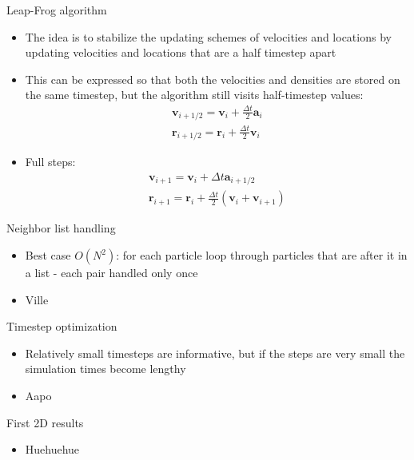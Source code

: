 \documentclass{beamer}
\begin{document}
\begin{frame}{Leap-Frog algorithm}
\begin{itemize}

\item The idea is to stabilize the updating schemes of velocities and locations by updating
velocities and locations that are a half timestep apart
\item This can be expressed so that both the velocities and densities are stored on the same
timestep, but the algorithm still visits half-timestep values:
\begin{eqnarray}
 \mathbf{v}_{i+1/2} = \mathbf{v}_i + \frac{\Delta t}{2} \mathbf{a}_i \\
 \mathbf{r}_{i+1/2} = \mathbf{r}_i + \frac{\Delta t}{2} \mathbf{v}_i
\end{eqnarray}
\item Full steps:
\begin{eqnarray}
\mathbf{v}_{i+1} = \mathbf{v}_i + \Delta t \mathbf{a}_{i+1/2} \\
\mathbf{r}_{i+1} = \mathbf{r}_i + \frac{\Delta t}{2} ( \mathbf{v}_i + \mathbf{v}_{i+1} )
\end{eqnarray}

\end{itemize}
\end{frame}

\begin{frame}{Neighbor list handling}
\begin{itemize}

\item Best case $O(N^2)$: for each particle loop through particles that are after it in a list -
each pair handled only once
\item Ville %

\end{itemize}
\end{frame}

\begin{frame}{Timestep optimization}
\begin{itemize}

\item Relatively small timesteps are informative, but if the steps are very small the simulation times become lengthy
\item Aapo %

\end{itemize}
\end{frame}

\begin{frame}{First 2D results}
\begin{itemize}

\item Huehuehue

\end{itemize}
\end{frame}
\end{document}
